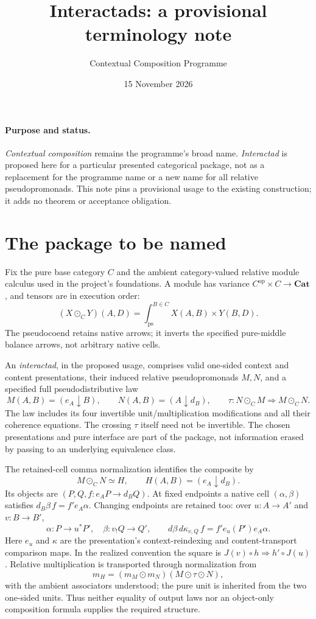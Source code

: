 \documentclass[11pt]{article}
\title{Interactads: a provisional terminology note}
\author{Contextual Composition Programme}
\date{15 November 2026}
\begin{document}
\maketitle

\paragraph{Purpose and status.}
\emph{Contextual composition} remains the programme's broad name.
\emph{Interactad} is proposed here for a particular presented categorical
package, not as a replacement for the programme name or a new name for
all relative pseudopromonads. This note pins a provisional usage to the
existing construction; it adds no theorem or acceptance obligation.

\section{The package to be named}
Fix the pure base category $C$ and the ambient category-valued relative
module calculus used in the project's foundations. A module has variance
$C^{\mathrm{op}}\times C\to\mathbf{Cat}$, and tensors are in execution order:
\[
 (X\odot_C Y)(A,D)=\int^{B\in C}_{\mathrm{ps}}X(A,B)\times Y(B,D).
\]
The pseudocoend retains native arrows; it inverts the specified pure-middle
balance arrows, not arbitrary native cells.

An \emph{interactad}, in the proposed usage, comprises valid one-sided
context and content presentations, their induced relative pseudopromonads
$M,N$, and a specified full pseudodistributive law
\[
 M(A,B)=(e_A\downarrow B),\qquad
 N(A,B)=(A\downarrow d_B),\qquad
 \tau:N\odot_C M\Longrightarrow M\odot_C N.
\]
The law includes its four invertible unit/multiplication modifications
and all their coherence equations. The crossing $\tau$ itself need not
be invertible. The chosen presentations and pure interface are part of
the package, not information erased by passing to an underlying equivalence
class.

The retained-cell comma normalization identifies the composite by
\[
 M\odot_C N\simeq H,\qquad H(A,B)=(e_A\downarrow d_B).
\]
Its objects are $(P,Q,f:e_AP\to d_BQ)$. At fixed endpoints a native cell
$(\alpha,\beta)$ satisfies $d_B\beta\,f=f'e_A\alpha$.
Changing endpoints are retained too: over $u:A\to A'$ and $v:B\to B'$,
\[
 \alpha:P\to u^*P',\quad \beta:v_!Q\to Q',\qquad
 d\beta\,d\kappa_{v,Q}\,f=f'e_u(P')e_A\alpha.
\]
Here $e_u$ and $\kappa$ are the presentation's context-reindexing and
content-transport comparison maps. In the realized convention the square
is $J(v)\circ h\Rightarrow h'\circ J(u)$.
Relative multiplication is transported through normalization from
\[
 m_H=(m_M\odot m_N)(M\odot\tau\odot N),
\]
with the ambient associators understood; the pure unit is inherited from
the two one-sided units. Thus neither equality of output laws nor an
object-only composition formula supplies the required structure.
\end{document}
